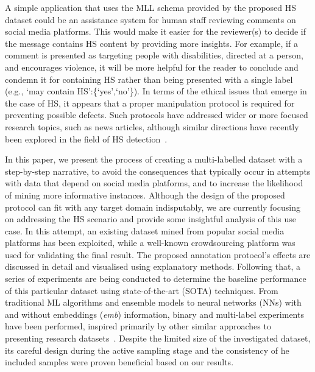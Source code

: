 \documentclass{article}
\begin{document}
A simple application that uses the MLL schema provided by the proposed HS dataset could be an assistance system for human staff reviewing comments on social media platforms. This would make it easier for the reviewer(s) to decide if the message contains HS content by providing more insights. For example, if a comment is presented as targeting people with disabilities, directed at a person, and encourages violence, it will be more helpful for the reader to conclude and condemn it for containing HS rather than being presented with a single label (e.g., `may contain HS':\{`yes',`no'\}). In terms of the ethical issues that emerge in the case of HS, it appears that a proper manipulation protocol is required for preventing possible defects. Such protocols have addressed wider or more focused research topics, such as news articles, although similar directions have recently been explored in the field of HS detection~\cite{DBLP:journals/corr/abs-2004-14454}. 



In this paper, we present the process of creating a multi-labelled dataset with a step-by-step narrative, to avoid the consequences that typically occur in attempts with data that depend on social media platforms, and to increase the likelihood of mining more informative instances. Although the design of the proposed protocol can fit with any target domain indisputably, we are currently focusing on addressing the HS scenario and provide some insightful analysis of this use case. In this attempt, an existing dataset mined from popular social media platforms has been exploited, while a well-known crowdsourcing platform was used for validating the final result. The proposed annotation protocol's effects are discussed in detail and visualised using explanatory methods. Following that, a series of experiments are being conducted to determine the baseline performance of this particular dataset using state-of-the-art (SOTA) techniques. From traditional ML algorithms and ensemble models to neural networks (NNs) with and without embeddings (\emph{emb}) information, binary and multi-label experiments have been performed, inspired primarily by other similar approaches to presenting research datasets~\cite{almeida2013towards,hateTweets,ljubesic-etal-2018-datasets}. Despite the limited size of the investigated dataset, its careful design during the active sampling stage and the consistency of he included samples were proven beneficial based on our results. 
\end{document}
